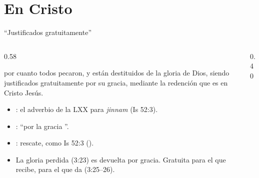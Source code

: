 \section{En Cristo}

\begin{frame}{``Justificados gratuitamente''}
\begin{columns}[c,onlytextwidth]
\begin{column}{0.58\textwidth}
\begin{cita}por cuanto todos pecaron, y están destituidos de la gloria de Dios, siendo justificados gratuitamente por su gracia, mediante la redención que es en Cristo Jesús.\end{cita}
\scriptsize\RaggedRight
\begin{itemize}
\item {}: el adverbio de la LXX para \emph{jinnam} (Is 52:3).
\item {}: ``por la gracia ''.
\item {}: rescate, como Is 52:3 ().
\item La gloria perdida (3:23) es devuelta por gracia. Gratuita para el que recibe,  para el que da (3:25--26).
\end{itemize}
\end{column}
\begin{column}{0.40\textwidth}\end{column}
\end{columns}
\end{frame}


